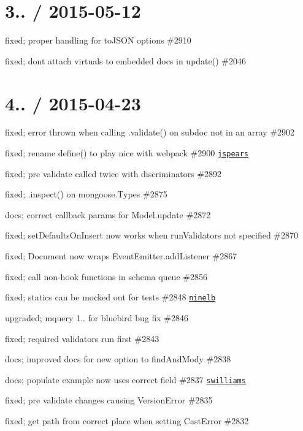 \section*{3.. / 2015-\/05-\/12 }


\begin{DoxyItemize}
\item fixed; proper handling for to\+J\+S\+ON options \#2910
\item fixed; dont attach virtuals to embedded docs in update() \#2046
\end{DoxyItemize}

\section*{4.. / 2015-\/04-\/23 }


\begin{DoxyItemize}
\item fixed; error thrown when calling .validate() on subdoc not in an array \#2902
\item fixed; rename define() to play nice with webpack \#2900 \href{https://github.com/jspears}{\tt jspears}
\item fixed; pre validate called twice with discriminators \#2892
\item fixed; .inspect() on mongoose.\+Types \#2875
\item docs; correct callback params for Model.\+update \#2872
\item fixed; set\+Defaults\+On\+Insert now works when run\+Validators not specified \#2870
\item fixed; Document now wraps Event\+Emitter.\+add\+Listener \#2867
\item fixed; call non-\/hook functions in schema queue \#2856
\item fixed; statics can be mocked out for tests \#2848 \href{https://github.com/ninelb}{\tt ninelb}
\item upgraded; mquery 1.. for bluebird bug fix \#2846
\item fixed; required validators run first \#2843
\item docs; improved docs for new option to find\+And\+Mody \#2838
\item docs; populate example now uses correct field \#2837 \href{https://github.com/swilliams}{\tt swilliams}
\item fixed; pre validate changes causing Version\+Error \#2835
\item fixed; get path from correct place when setting Cast\+Error \#2832

\end{DoxyItemize}
